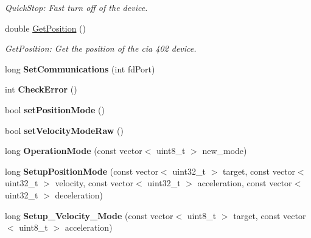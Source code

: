 \begin{DoxyCompactItemize}
\begin{DoxyCompactList}\small\item\em Quick\+Stop\+: Fast turn off of the device. \end{DoxyCompactList}\item 
double \hyperlink{classCiA402Device_ac8d9e36e6f457565cac7d26d91e4a712}{Get\+Position} ()
\begin{DoxyCompactList}\small\item\em Get\+Position\+: Get the position of the cia 402 device. \end{DoxyCompactList}\item 
\mbox{\label{classCiA402Device_abf511a7d44b62ac93ae18fe21f8d51c9}} 
long {\bfseries Set\+Communications} (int fd\+Port)
\item 
\mbox{\label{classCiA402Device_af1ed15805579e85e514e7ccf4ff21e10}} 
int {\bfseries Check\+Error} ()
\item 
\mbox{\label{classCiA402Device_a8c09be8df402061e170ca297a7ee6cfe}} 
bool {\bfseries set\+Position\+Mode} ()
\item 
\mbox{\label{classCiA402Device_a4abf9605004db99567ede3370e1d0a4d}} 
bool {\bfseries set\+Velocity\+Mode\+Raw} ()
\item 
\mbox{\label{classCiA402Device_a49f298cf0d4d2d68007b3cb396e93a17}} 
long {\bfseries Operation\+Mode} (const vector$<$ uint8\+\_\+t $>$ new\+\_\+mode)
\item 
\mbox{\label{classCiA402Device_abca4743b617d109a915215193bd06fbe}} 
long {\bfseries Setup\+Position\+Mode} (const vector$<$ uint32\+\_\+t $>$ target, const vector$<$ uint32\+\_\+t $>$ velocity, const vector$<$ uint32\+\_\+t $>$ acceleration, const vector$<$ uint32\+\_\+t $>$ deceleration)
\item 
\mbox{\label{classCiA402Device_a42e8505120ada57ea8292902ce9f9c5e}} 
long {\bfseries Setup\+\_\+\+Velocity\+\_\+\+Mode} (const vector$<$ uint8\+\_\+t $>$ target, const vector$<$ uint8\+\_\+t $>$ acceleration)
\item 
\mbox{\label{classCiA402Device_aff0503b4caa6d2a8e2e66df6b9e0f4e4}} 

\end{DoxyCompactItemize}
